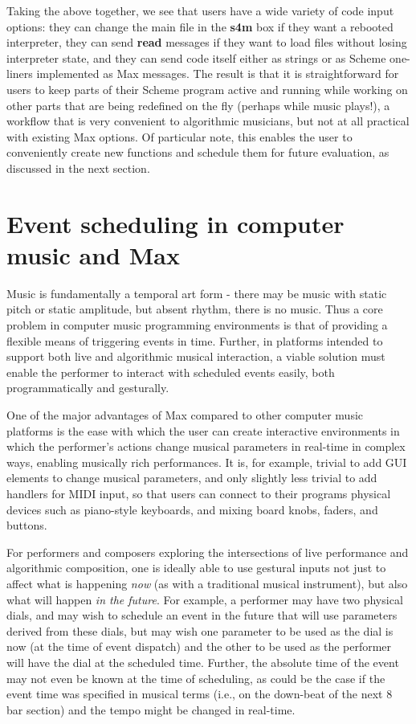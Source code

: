 \documentclass[acmsmall]{acmart}
\begin{document}
Taking the above together, we see that users have a wide variety of code input options:
they can change the main file in the \textbf{s4m} box if they want a rebooted interpreter,
they can send \textbf{read} messages if they want to load files without losing 
interpreter state, and they can send code itself either as strings or as Scheme
one-liners implemented as Max messages. The result is that it is straightforward
for users to keep parts of their Scheme program active and running
while working on other parts that are being redefined on the fly (perhaps while music plays!),
a workflow that is very convenient to algorithmic musicians, but not at all practical with existing
Max options. Of particular note, this enables the user to
conveniently create new functions and schedule them for future evaluation,
as discussed in the next section.


\section{Event scheduling in computer music and Max}

Music is fundamentally a temporal art form - there may be music with static pitch
or static amplitude, but absent rhythm, there is no music.  
Thus a core problem in computer music programming environments is that of providing a flexible 
means of triggering events in time. Further, in platforms intended to support both
live and algorithmic musical interaction, a viable solution must enable the performer
to interact with scheduled events easily, both programmatically and gesturally. 

One of the major advantages of Max compared to other computer music platforms 
is the ease with which the user can create interactive environments in which the performer's actions 
change musical parameters in real-time in complex ways, enabling 
musically rich performances. It is, for example, trivial to add GUI elements to change
musical parameters, and only slightly less trivial to add handlers for MIDI input, 
so that users can connect to their programs physical devices such as
piano-style keyboards, and mixing board knobs, faders, and buttons. 

For performers and composers exploring the intersections of live performance and algorithmic
composition, one is ideally able to use gestural inputs not just to affect
what is happening \textit{now} (as with a traditional musical instrument), but also what will 
happen \textit{in the future}. For example, a performer may have two physical dials,
and may wish to schedule an event in the future that will use parameters derived
from these dials, but may wish one parameter to be used as the dial is now
(at the time of event dispatch) 
and the other to be used as the performer will have the dial at the scheduled time.
Further, the absolute time of the event may not even be known at the time of 
scheduling, as could be the case if the event time was specified in musical terms 
(i.e., on the down-beat of the next 8 bar section) and the tempo might be changed in real-time. 
\end{document}
